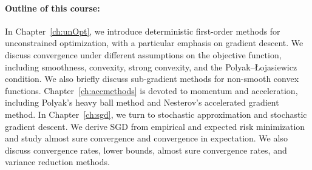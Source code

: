 \documentclass[12pt,openany]{book}
\theoremstyle{definition}
\theoremstyle{definition}
\begin{document}
\paragraph{Outline of this course:} 
In Chapter~\ref{ch:unOpt}, we introduce deterministic first-order methods for unconstrained
optimization, with a particular emphasis on gradient descent. We discuss convergence under
different assumptions on the objective function, including smoothness, convexity, strong
convexity, and the Polyak--{\L}ojasiewicz condition. We also briefly discuss sub-gradient
methods for non-smooth convex functions. Chapter~\ref{ch:accmethods} is devoted to
momentum and acceleration, including Polyak's heavy ball method and Nesterov's accelerated
gradient method. In Chapter~\ref{ch:sgd}, we turn to stochastic approximation and stochastic
gradient descent. We derive SGD from empirical and expected risk minimization and study almost sure convergence
and convergence in expectation. We also discuss convergence rates, lower bounds,
almost sure convergence rates, and variance reduction methods.
\end{document}
